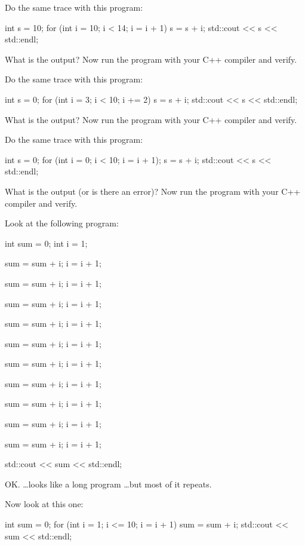 \begin{ex}
Do the same trace with this program:
\begin{console}
int s = 10;
for (int i = 10; i < 14; i = i + 1)
{   
    s = s + i;
}
std::cout << s << std::endl;
\end{console}
\end{ex}
What is the output? Now run the program with your C++ compiler and
verify.

\begin{ex}
Do the same trace with this program:
\begin{console}
int s = 0;
for (int i = 3; i < 10; i += 2)
{   
    s = s + i;
}
std::cout << s << std::endl;
\end{console}
\end{ex}

What is the output? Now run the program with your C++ compiler and
verify.

\begin{ex}
Do the same trace with this program:
\begin{console}
int s = 0;
for (int i = 0; i < 10; i = i + 1);
    s = s + i;
std::cout << s << std::endl;
\end{console}
\end{ex}
What is the output (or is there an error)? Now run the program with your
C++ compiler and verify.

\newpage{}

Look at the following program:
\begin{console}
int sum = 0;
int i = 1;

sum = sum + i;
i = i + 1;

sum = sum + i;
i = i + 1;

sum = sum + i;
i = i + 1;

sum = sum + i;
i = i + 1;

sum = sum + i;
i = i + 1;

sum = sum + i;
i = i + 1;

sum = sum + i;
i = i + 1;

sum = sum + i;
i = i + 1;

sum = sum + i;
i = i + 1;

sum = sum + i;
i = i + 1;

std::cout << sum << std::endl;
\end{console}

OK. \ldots looks like a long program \ldots but most of it repeats.

Now look at this one:
\begin{console}
int sum = 0;
for (int i = 1; i <= 10; i = i + 1)
{   
    sum = sum + i;
}
std::cout << sum << std::endl;
\end{console}

